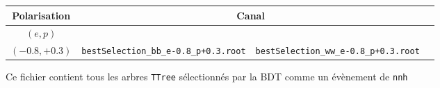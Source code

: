 

\begin{figure}[h!]
	\centering
	\begin{tabular}{ | c | c | c | c | }
		\hline
		Polarisation & \multicolumn{2}{c|}{Canal} \\
		\hline
		$(e,p)$ & \bb &  \WW \\
		\hline
		\hline \cline{2-3}
		$(-0.8, +0.3)$ & \verb|bestSelection_bb_e-0.8_p+0.3.root| & \verb|bestSelection_ww_e-0.8_p+0.3.root| \\
		\hline
	\end{tabular}
	\label{files:bestSelection}
	\caption{Ce fichier \ROOT contient tous les arbres \texttt{TTree} 
		sélectionnés par la BDT comme un évènement de \texttt{nnh}}
\end{figure}